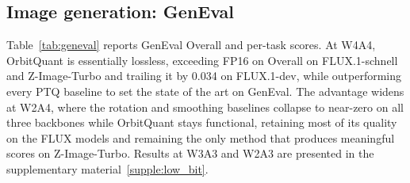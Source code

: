 
\subsection{Image generation: GenEval}
\label{sec:exp:image}
Table~\ref{tab:geneval} reports GenEval Overall and per-task scores. At W4A4, OrbitQuant is essentially lossless, exceeding FP16 on Overall on FLUX.1-schnell and Z-Image-Turbo and trailing it by 0.034 on FLUX.1-dev, while outperforming every PTQ baseline to set the state of the art on GenEval. The advantage widens at W2A4, where the rotation and smoothing baselines collapse to near-zero on all three backbones while OrbitQuant stays functional, retaining most of its quality on the FLUX models and remaining the only method that produces meaningful scores on Z-Image-Turbo. Results at W3A3 and W2A3 are presented in the supplementary material~\ref{supple:low_bit}.

